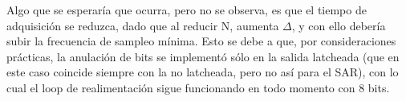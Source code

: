 \documentclass[assd_tp3_main.tex]{subfiles}
\begin{document}
Algo que se esperar\'ia que ocurra, pero no se observa, es que el tiempo de adquisici\'on se reduzca, dado que al reducir N, aumenta $\Delta$, y con ello deber\'ia subir la frecuencia de sampleo m\'inima. Esto se debe a que, por consideraciones pr\'acticas, la anulaci\'on de bits se implement\'o s\'olo en la salida latcheada (que en este caso coincide siempre con la no latcheada, pero no as\'i para el SAR), con lo cual el loop de realimentaci\'on sigue funcionando en todo momento con 8 bits.
\end{document}
